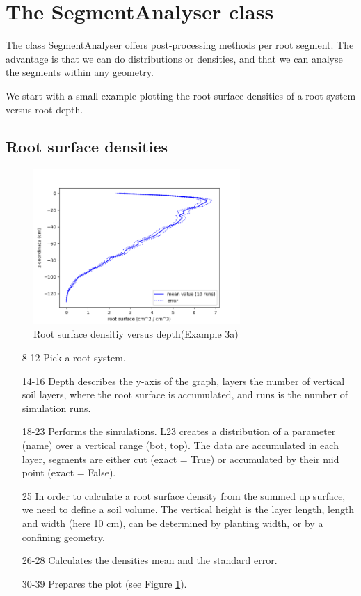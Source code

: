 \newpage
\section{The SegmentAnalyser class} \label{sec:sa}

The class SegmentAnalyser offers post-processing methods per root segment. The advantage is that we can do distributions or densities, and that we can analyse the segments within any geometry. 

We start with a small example plotting the root surface densities of a root system versus root depth.

\subsection{Root surface densities}



\begin{figure}
\centering
\includegraphics[width=0.7\textwidth]{example_3c.png}
\caption{Root surface densitiy versus depth(Example 3a)} \label{fig:surface_density}
\end{figure}


\begin{itemize}

\item[8-12] Pick a root system.
\item[14-16] Depth describes the y-axis of the graph, layers the number of vertical soil layers, where the root surface is accumulated, and runs is the number of simulation runs. 
\item[18-23] Performs the simulations. L23 creates a distribution of a parameter (name) over a vertical range (bot, top). The data are accumulated in each layer, segments are either cut (exact = True) or accumulated by their mid point (exact = False). 
\item[25] In order to calculate a root surface density from the summed up surface, we need to define a soil volume. The vertical height is the layer length, length and width (here 10 cm), can be determined by planting width, or by a confining geometry. 
\item[26-28] Calculates the densities mean and the standard error. 
\item[30-39] Prepares the plot (see Figure \ref{fig:surface_density}).

\end{itemize}



